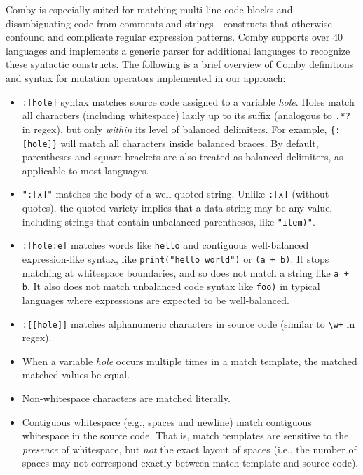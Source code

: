 \documentclass[sigconf,review, anonymous]{acmart}
\begin{document}
{Comby is especially suited for matching multi-line code blocks and
disambiguating code from comments and strings---constructs that otherwise
confound and complicate regular expression patterns. Comby supports over 40
languages and implements a generic parser for additional languages to recognize
these syntactic constructs. The following is a brief overview of Comby
definitions and syntax for mutation operators implemented in our approach:

\begin{itemize}

\item \texttt{\small:[hole]} syntax matches source code assigned to a variable \emph{hole}. Holes match all characters (including whitespace) lazily up to its suffix (analogous to \texttt{\small.*?} in regex), but only \emph{within} its level of balanced delimiters. For example, \texttt{\small\{:[hole]\}} will match all characters inside balanced braces. By default, parentheses and square brackets are also treated as balanced delimiters, as applicable to most languages. 

\item \texttt{\small ":[x]"} matches the body of a well-quoted string. Unlike \texttt{\small :[x]} (without quotes), the quoted variety implies that a data string may be any value, including strings that contain unbalanced parentheses, like \texttt{\small "item)"}.

\item \texttt{\small:[hole:e]} matches words like \texttt{\small hello} and contiguous well-balanced expression-like syntax, like \texttt{\small print("hello world")} or \texttt{\small (a + b)}. It stops matching at whitespace boundaries, and so does not match a string like \texttt{\small a + b}. It also does not match unbalanced code syntax like \texttt{\small foo)} in typical languages where expressions are expected to be well-balanced.

\item \texttt{\small :[[hole]]} matches alphanumeric characters in source code (similar to \texttt{\small\textbackslash w+} in regex).

\item When a variable \emph{hole} occurs multiple times in a match template, the matched matched values be equal.

\item Non-whitespace characters are matched literally.

\item Contiguous whitespace (e.g., spaces and newline) match contiguous whitespace in the source code. That is, match templates are sensitive to the \emph{presence} of whitespace, but \emph{not} the exact layout of spaces (i.e., the number of spaces may not correspond exactly between match template and source code).


\end{itemize}}
\end{document}
